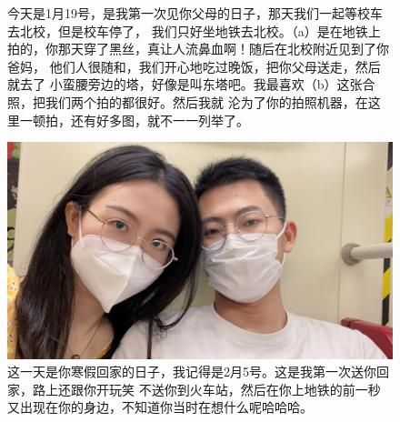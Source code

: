\documentclass[cn,11pt,chinese]{elegantbook}
\begin{document}
\begin{figure}
    \caption{今天是1月19号，是我第一次见你父母的日子，那天我们一起等校车去北校，但是校车停了，
    我们只好坐地铁去北校。（a）是在地铁上拍的，你那天穿了黑丝，真让人流鼻血啊！随后在北校附近见到了你爸妈，
    他们人很随和，我们开心地吃过晚饭，把你父母送走，然后就去了
    小蛮腰旁边的塔，好像是叫东塔吧。我最喜欢（b）这张合照，把我们两个拍的都很好。然后我就
    沦为了你的拍照机器，在这里一顿拍，还有好多图，就不一一列举了。}
\end{figure}

\begin{figure}
    \includegraphics[height=0.2\textheight]{figure/figure/mask.jpg}
    \caption{这一天是你寒假回家的日子，我记得是2月5号。这是我第一次送你回家，路上还跟你开玩笑
    不送你到火车站，然后在你上地铁的前一秒又出现在你的身边，不知道你当时在想什么呢哈哈哈。}
\end{figure}
\end{document}
